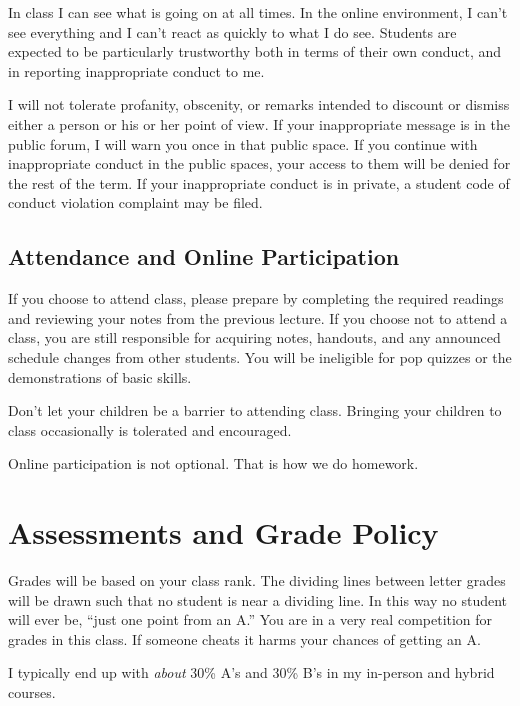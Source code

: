 \documentclass[letterpaper,10pt]{article}
\begin{document}
In class I can see what is going on at all times.  In the online
environment, I can't see everything and I can't react as quickly to
what I do see.  Students are expected to be particularly trustworthy
both in terms of their own conduct, and in reporting inappropriate
conduct to me.

I will not tolerate profanity, obscenity, or remarks intended to
discount or dismiss either a person or his or her point of view. If your inappropriate message is in the public forum, I will warn you
once in that public space. If you continue with inappropriate conduct
in the public spaces, your access to them will be denied for the rest
of the term. If your inappropriate
conduct is in private, a student code of conduct violation complaint
may be filed.

 \subsection{Attendance and Online Participation}
 
 If you choose to attend class, please prepare by
 completing the required readings and reviewing your notes from the
 previous lecture. If you choose not to attend a class, you are still
 responsible for acquiring notes, handouts, and any announced schedule
 changes from other students.  You will be ineligible for pop quizzes
 or the demonstrations of basic skills.
 
 Don't let your children be a barrier to attending class. Bringing your
 children to class occasionally is tolerated and encouraged.
 
 Online participation is not optional.  That is how we do homework.

\section{Assessments and Grade Policy}


Grades will be based on your class rank.  The dividing lines between letter grades will be
drawn such that no student is near a dividing line. In this way no
student will ever be, ``just one point from an A.'' You are in a very
real competition for grades in this class. If someone cheats it harms
your chances of getting an A. 

I typically end up with \emph{about} 30\%
A's and 30\% B's in my in-person and hybrid courses.    
\end{document}
